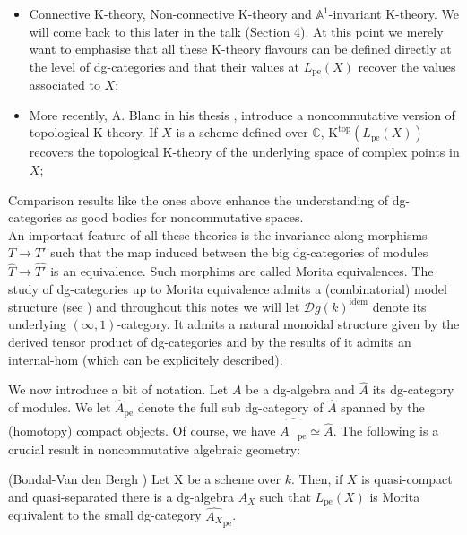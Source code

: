 \begin{refsection}
\begin{itemize}
\item Connective K-theory, Non-connective K-theory and $\mathbb{A}^1$-invariant K-theory. We will come back to this later in the talk (Section 4). At this point we merely want to emphasise that all these K-theory flavours can be defined directly at the level of dg-categories and that their values at $L_\mathrm{pe}(X)$ recover the values associated to $X$;

\item More recently, A. Blanc in his thesis \cite{Anthony-thesis}, introduce a noncommutative version of topological K-theory. If $X$ is a scheme defined over $\mathbb{C}$, $\mathrm{K}^{\mathrm{top}}(L_\mathrm{pe}(X))$ recovers the topological K-theory of the underlying space of complex points in $X$;
\end{itemize}

Comparison results like the ones above enhance the understanding of dg-categories as good bodies for noncommutative spaces.\\

An important feature of all these theories is the invariance along morphisms $T\to T'$ such that the map induced between the big dg-categories of modules $\widehat{T}\to \widehat{T'}$ is an equivalence. Such morphims are called Morita equivalences. The study of dg-categories up to Morita equivalence admits a (combinatorial) model structure (see \cite{tabuada-quillen}) and throughout this notes we will let $\mathcal{D}g(k)^\mathrm{idem}$ denote its underlying $(\infty,1)$-category. It admits a natural monoidal structure given by the derived tensor product of dg-categories and by the results of \cite{toen} it admits an internal-hom (which can be explicitely described).


We now introduce a bit of notation. Let $A$ be a dg-algebra and $\widehat{A}$ its dg-category of modules. We let $\widehat{A}_{\mathrm{pe}}$ denote the full sub dg-category of $\widehat{A}$ spanned by the (homotopy) compact objects. Of course, we have $\widehat{\widehat{\!\!\!\!\!A\ \ \ }_{\mathrm{pe}}} \simeq \widehat{A}$.  The following is a crucial result in noncommutative algebraic geometry:

\begin{thm}(Bondal-Van den Bergh \cite{bondal-vandenbergh})
Let X be a scheme over $k$. Then, if $X$ is quasi-compact and quasi-separated there is a dg-algebra $A_X$ such that $L_\mathrm{pe}(X)$ is Morita equivalent to the small dg-category $\widehat{A_X}_\mathrm{pe}$.
\end{thm}


\end{refsection}
